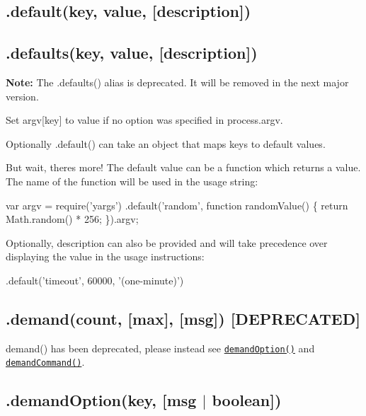 \subsection*{\label{_default}%
.default(key, value, \mbox{[}description\mbox{]}) }

\subsection*{.defaults(key, value, \mbox{[}description\mbox{]}) }

{\bfseries Note\+:} The {\ttfamily .defaults()} alias is deprecated. It will be removed in the next major version.

Set {\ttfamily argv\mbox{[}key\mbox{]}} to {\ttfamily value} if no option was specified in {\ttfamily process.\+argv}.

Optionally {\ttfamily .default()} can take an object that maps keys to default values.

But wait, there\textquotesingle{}s more! The default value can be a {\ttfamily function} which returns a value. The name of the function will be used in the usage string\+:


\begin{DoxyCode}
var argv = require('yargs')
  .default('random', function randomValue() \{
    return Math.random() * 256;
  \}).argv;
\end{DoxyCode}


Optionally, {\ttfamily description} can also be provided and will take precedence over displaying the value in the usage instructions\+:


\begin{DoxyCode}
.default('timeout', 60000, '(one-minute)')
\end{DoxyCode}


\subsection*{\label{_demand}%
.demand(count, \mbox{[}max\mbox{]}, \mbox{[}msg\mbox{]}) \mbox{[}D\+E\+P\+R\+E\+C\+A\+T\+ED\mbox{]} }

{\ttfamily demand()} has been deprecated, please instead see \href{#demandOption}{\tt {\ttfamily demand\+Option()}} and \href{#demandCommand}{\tt {\ttfamily demand\+Command()}}.

\subsection*{\label{_demandOption}%
.demand\+Option(key, \mbox{[}msg $\vert$ boolean\mbox{]}) }

